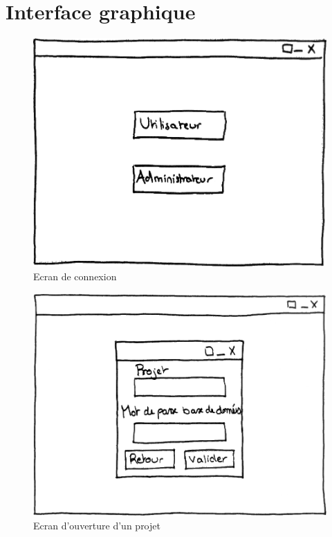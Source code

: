 \documentclass[12pt]{report}
\begin{document}
\section{Interface graphique}

\begin{figure}
\centering
\includegraphics[scale=0.5]{IHM_1a.png}
\caption{Ecran de connexion}
\end{figure}

\begin{figure}
\centering
\includegraphics[scale=0.5]{IHM_6a.png}
\caption{Ecran d'ouverture d'un projet}
\end{figure}
\end{document}
